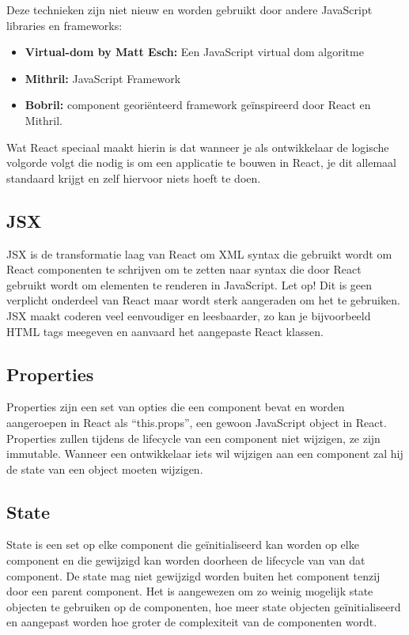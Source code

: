 		Deze technieken zijn niet nieuw en worden gebruikt door andere JavaScript libraries en frameworks:
		
		\begin{itemize}
			\item \textbf{Virtual-dom by Matt Esch:} Een JavaScript virtual dom algoritme
			\item \textbf{Mithril:} JavaScript Framework
			\item \textbf{Bobril:} component georiënteerd framework geïnspireerd door React en Mithril.
		\end{itemize}
		
		Wat React speciaal maakt hierin is dat wanneer je als ontwikkelaar de logische volgorde volgt die nodig is om een applicatie te bouwen in React, je dit allemaal standaard krijgt en zelf hiervoor niets hoeft te doen.
	
	\subsection{JSX}
		
		JSX is de transformatie laag van React om XML syntax die gebruikt wordt om React componenten te schrijven om te zetten naar syntax die door React gebruikt wordt om elementen te renderen in JavaScript. Let op! Dit is geen verplicht onderdeel van React maar wordt sterk aangeraden om het te gebruiken. JSX maakt coderen veel eenvoudiger en leesbaarder, zo kan je bijvoorbeeld HTML tags meegeven en aanvaard het aangepaste React klassen.
		
	
	\subsection{Properties}
		
		Properties zijn een set van opties die een component bevat en worden aangeroepen in React als ``this.props'', een gewoon JavaScript object in React. Properties zullen tijdens de lifecycle van een component niet wijzigen, ze zijn immutable. Wanneer een ontwikkelaar iets wil wijzigen aan een component zal hij de state van een object moeten wijzigen.
	
	\subsection{State}
		
		State is een set op elke component die geïnitialiseerd kan worden op elke component en die gewijzigd kan worden doorheen de lifecycle van van dat component. De state mag niet gewijzigd worden buiten het component tenzij door een parent component. Het is aangewezen om zo weinig mogelijk state objecten te gebruiken op de componenten, hoe meer state objecten geïnitialiseerd en aangepast worden hoe groter de complexiteit van de componenten wordt.
	
